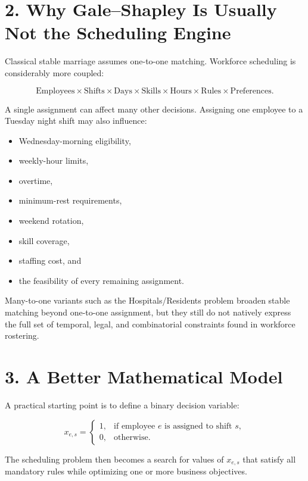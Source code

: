\documentclass[11pt]{article}
\begin{document}
\section{2. Why Gale--Shapley Is Usually Not the Scheduling Engine}

Classical stable marriage assumes one-to-one matching. Workforce scheduling is considerably more coupled:

\[
\text{Employees}
\times
\text{Shifts}
\times
\text{Days}
\times
\text{Skills}
\times
\text{Hours}
\times
\text{Rules}
\times
\text{Preferences}.
\]

A single assignment can affect many other decisions. Assigning one employee to a Tuesday night shift may also influence:

\begin{itemize}
  \item Wednesday-morning eligibility,
  \item weekly-hour limits,
  \item overtime,
  \item minimum-rest requirements,
  \item weekend rotation,
  \item skill coverage,
  \item staffing cost, and
  \item the feasibility of every remaining assignment.
\end{itemize}

Many-to-one variants such as the Hospitals/Residents problem broaden stable matching beyond one-to-one assignment, but they still do not natively express the full set of temporal, legal, and combinatorial constraints found in workforce rostering.

\section{3. A Better Mathematical Model}

A practical starting point is to define a binary decision variable:

\[
x_{e,s} =
\begin{cases}
1, & \text{if employee } e \text{ is assigned to shift } s,\\
0, & \text{otherwise.}
\end{cases}
\]

The scheduling problem then becomes a search for values of \(x_{e,s}\) that satisfy all mandatory rules while optimizing one or more business objectives.
\end{document}
